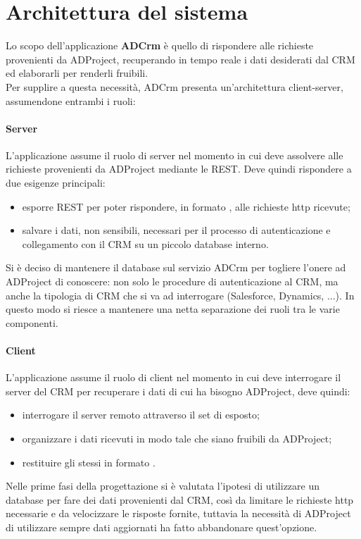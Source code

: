 \section{Architettura del sistema}
Lo scopo dell'applicazione \textbf{ADCrm} è quello di rispondere alle richieste provenienti da ADProject, recuperando in tempo reale i dati desiderati dal CRM ed elaborarli per renderli fruibili.\\
Per supplire a questa necessità, ADCrm presenta un'architettura client-server, assumendone entrambi i ruoli:
\paragraph{Server}
L'applicazione assume il ruolo di server nel momento in cui deve assolvere alle richieste provenienti da ADProject mediante le  REST. Deve quindi rispondere a due esigenze principali:
\begin{itemize}
	\item esporre  REST per poter rispondere, in formato , alle richieste \gls{http} ricevute;
	\item salvare i dati, non sensibili, necessari per il processo di autenticazione e collegamento con il CRM su un piccolo database interno.
\end{itemize} 

Si è deciso di mantenere il database sul servizio ADCrm per togliere l'onere ad ADProject di conoscere: non solo le procedure di autenticazione al CRM, ma anche la tipologia di CRM che si va ad interrogare (Salesforce, Dynamics, ...). In questo modo si riesce a mantenere una netta separazione dei ruoli tra le varie componenti. 

\paragraph{Client}
L'applicazione assume il ruolo di client nel momento in cui deve interrogare il server del CRM per recuperare i dati di cui ha bisogno ADProject, deve quindi:
\begin{itemize}
	\item interrogare il server remoto attraverso il set di  esposto;
	\item organizzare i dati ricevuti in modo tale che siano fruibili da ADProject;
	\item restituire gli stessi in formato .
\end{itemize}

Nelle prime fasi della progettazione si è valutata l'ipotesi di utilizzare un database per fare  dei dati provenienti dal CRM, così da limitare le richieste \gls{http} necessarie e da velocizzare le risposte fornite, tuttavia la necessità di ADProject di utilizzare sempre dati aggiornati ha fatto abbandonare quest'opzione.\\

